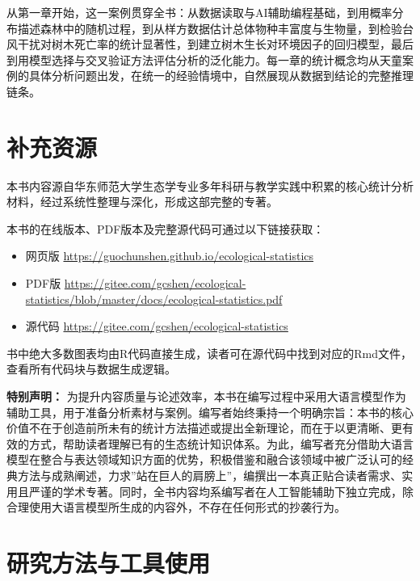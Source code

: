\documentclass[
  twoside,12pt,fontset=none]{ctexbook}
\providecommand{\tightlist}{%
  \setlength{\itemsep}{0pt}\setlength{\parskip}{0pt}}
\begin{document}
从第一章开始，这一案例贯穿全书：从数据读取与AI辅助编程基础，到用概率分布描述森林中的随机过程，到从样方数据估计总体物种丰富度与生物量，到检验台风干扰对树木死亡率的统计显著性，到建立树木生长对环境因子的回归模型，最后到用模型选择与交叉验证方法评估分析的泛化能力。每一章的统计概念均从天童案例的具体分析问题出发，在统一的经验情境中，自然展现从数据到结论的完整推理链条。

\hypertarget{ux8865ux5145ux8d44ux6e90}{%
\section{补充资源}\label{ux8865ux5145ux8d44ux6e90}}

本书内容源自华东师范大学生态学专业多年科研与教学实践中积累的核心统计分析材料，经过系统性整理与深化，形成这部完整的专著。

本书的在线版本、PDF版本及完整源代码可通过以下链接获取：

\begin{itemize}
\tightlist
\item
  网页版 \url{https://guochunshen.github.io/ecological-statistics}
\item
  PDF版 \url{https://gitee.com/gcshen/ecological-statistics/blob/master/docs/ecological-statistics.pdf}
\item
  源代码 \url{https://gitee.com/gcshen/ecological-statistics}
\end{itemize}

书中绝大多数图表均由R代码直接生成，读者可在源代码中找到对应的Rmd文件，查看所有代码块与数据生成逻辑。

\textbf{特别声明：} 为提升内容质量与论述效率，本书在编写过程中采用大语言模型作为辅助工具，用于准备分析素材与案例。编写者始终秉持一个明确宗旨：本书的核心价值不在于创造前所未有的统计方法描述或提出全新理论，而在于以更清晰、更有效的方式，帮助读者理解已有的生态统计知识体系。为此，编写者充分借助大语言模型在整合与表达领域知识方面的优势，积极借鉴和融合该领域中被广泛认可的经典方法与成熟阐述，力求''站在巨人的肩膀上''，编撰出一本真正贴合读者需求、实用且严谨的学术专著。同时，全书内容均系编写者在人工智能辅助下独立完成，除合理使用大语言模型所生成的内容外，不存在任何形式的抄袭行为。

\hypertarget{ux7814ux7a76ux65b9ux6cd5ux4e0eux5de5ux5177ux4f7fux7528}{%
\section{研究方法与工具使用}\label{ux7814ux7a76ux65b9ux6cd5ux4e0eux5de5ux5177ux4f7fux7528}}
\end{document}
